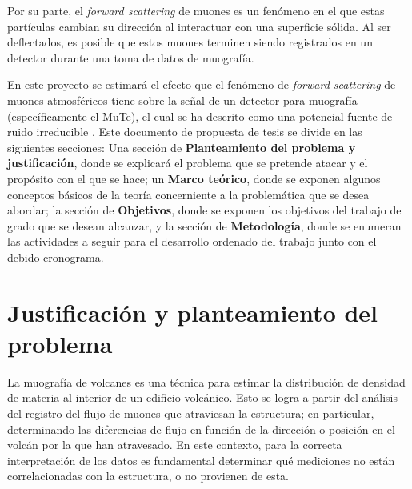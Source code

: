 \documentclass[12pt]{report}
\begin{document}
Por su parte, el \textit{forward scattering} de muones es un fenómeno en el que estas partículas cambian su dirección al interactuar con una superficie sólida. Al ser deflectados, es posible que estos muones terminen siendo registrados en un detector durante una toma de datos de muografía.

En este proyecto se estimará el efecto que el fenómeno de \textit{forward scattering} de muones atmosféricos tiene sobre la señal de un detector para muografía (específicamente el MuTe), el cual se ha descrito como una potencial fuente de ruido irreducible \cite{gomez2017forward}. Este documento de propuesta de tesis se divide en las siguientes secciones: Una sección de \textbf{Planteamiento del problema y justificación}, donde se explicará el problema que se pretende atacar y el propósito con el que se hace; un \textbf{Marco teórico}, donde se exponen algunos conceptos básicos de la teoría concerniente a la problemática que se desea abordar; la sección de \textbf{Objetivos}, donde se exponen los objetivos del trabajo de grado que se desean alcanzar, y la sección de \textbf{Metodología}, donde se enumeran las actividades a seguir para el desarrollo ordenado del trabajo junto con el debido cronograma.


\section*{Justificación y planteamiento del problema}

La muografía de volcanes es una técnica para estimar la distribución de densidad de materia al interior de un edificio volcánico. Esto se logra a partir del análisis del registro del flujo de muones que atraviesan la estructura; en particular, determinando las diferencias de flujo en función de la dirección o posición en el volcán por la que han atravesado. En este contexto, para la correcta interpretación de los datos es fundamental determinar qué mediciones no están correlacionadas con la estructura, o no provienen de esta.
\end{document}
